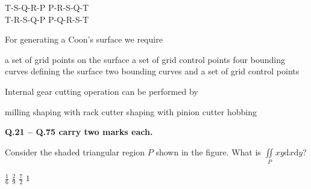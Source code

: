 \documentclass[addpoints,10pt]{exam}
\begin{document}
\begin{questions}
    \begin{oneparchoices}
        \choice T-S-Q-R-P
        \choice P-R-S-Q-T\\
        \choice T-R-S-Q-P
        \choice P-Q-R-S-T
    \end{oneparchoices}

    \question For generating a Coon's surface we require
    \begin{choices}
        \choice a set of grid points on the surface
        \choice a set of grid control points
        \choice four bounding curves defining the surface
        \choice two bounding curves and a set of grid control points
    \end{choices}

    \question Internal gear cutting operation can be performed by
    \begin{choices}
        \choice milling
        \choice shaping with rack cutter
        \choice shaping with pinion cutter
        \choice hobbing
    \end{choices}
\end{questions}
\pagebreak
\large\textbf{Q.21 -- Q.75 carry two marks each.}\\
\begin{questions}
    \question Consider the shaded triangular region $P$ shown in the figure. What is $\iint\limits_P xy\mathrm{d}x\mathrm{d}y$?
    \begin{center}
    \end{center}

    \begin{oneparchoices}
        \choice $\frac{1}{6}$
        \choice $\frac{2}{9}$
        \choice $\frac{7}{2}$
        \choice $1$
    \end{oneparchoices}
\end{questions}
\end{document}
